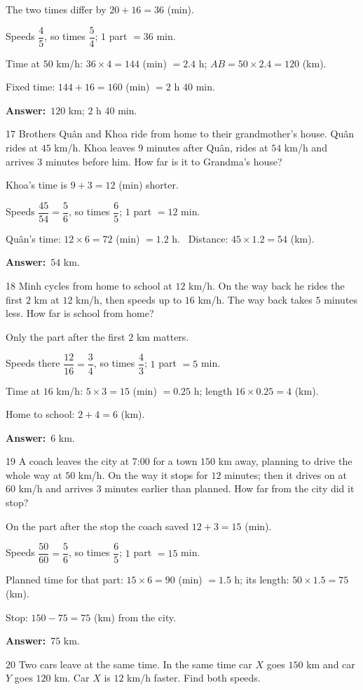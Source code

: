 \documentclass[11pt]{article}
\newif\ifsol \solfalse
\providecommand{\AnsWord}{Đáp số}
\newcommand{\dapso}[1]{\par\textbf{\AnsWord:}\ #1}
\newcommand{\probsol}[1]{%
  \begin{lrbox}{\solmeasure}\begin{minipage}{\dimexpr\linewidth-24pt\relax}#1\end{minipage}\end{lrbox}%
  \ifsol
    \begin{solbox}#1\end{solbox}%
  \else
    \setlength{\solht}{\dimexpr\ht\solmeasure+\dp\solmeasure+0.85cm\relax}%
    \ifdim\solht<1.35cm\setlength{\solht}{1.35cm}\fi
    \begin{tcolorbox}[colback=white,colframe=Line,boxrule=0.8pt,arc=5pt,
      left=8pt,right=8pt,top=4pt,bottom=4pt,height=\solht]{\footnotesize\color{Slate}\itshape\WorkWord}\end{tcolorbox}%
  \fi}
\newcommand{\gap}{\vspace{0.3cm}}
\def\WorkWord{Your work:}
\def\AnsWord{Answer}
\begin{document}
\probsol{
The two times differ by $20+16=36$ (min).\par Speeds $\dfrac45$, so times $\dfrac54$; $1$ part $=36$ min.\par
Time at $50$ km/h: $36\times4=144$ (min) $=2.4$ h; $AB=50\times2.4=120$ (km).\par
Fixed time: $144+16=160$ (min) $=2$ h $40$ min.
\dapso{$120$ km; $2$ h $40$ min.}}
\gap
\begin{probbox}{17}{\relax}
Brothers Quân and Khoa ride from home to their grandmother's house. Quân rides at $45$ km/h. Khoa leaves $9$ minutes after Quân, rides at $54$ km/h and arrives $3$ minutes before him. How far is it to Grandma's house?
\end{probbox}
\probsol{
Khoa's time is $9+3=12$ (min) shorter.\par Speeds $\dfrac{45}{54}=\dfrac56$, so times $\dfrac65$; $1$ part $=12$ min.\par
Quân's time: $12\times6=72$ (min) $=1.2$ h. \ Distance: $45\times1.2=54$ (km).
\dapso{$54$ km.}}
\gap
\begin{probbox}{18}{\relax}
Minh cycles from home to school at $12$ km/h. On the way back he rides the first $2$ km at $12$ km/h, then speeds up to $16$ km/h. The way back takes $5$ minutes less. How far is school from home?
\end{probbox}
\probsol{
Only the part after the first $2$ km matters.\par Speeds there $\dfrac{12}{16}=\dfrac34$, so times $\dfrac43$; $1$ part $=5$ min.\par
Time at $16$ km/h: $5\times3=15$ (min) $=0.25$ h; length $16\times0.25=4$ (km).\par Home to school: $2+4=6$ (km).
\dapso{$6$ km.}}
\gap
\begin{probbox}{19}{\relax}
A coach leaves the city at 7:00 for a town $150$ km away, planning to drive the whole way at $50$ km/h. On the way it stops for $12$ minutes; then it drives on at $60$ km/h and arrives $3$ minutes earlier than planned. How far from the city did it stop?
\end{probbox}
\probsol{
On the part after the stop the coach saved $12+3=15$ (min).\par Speeds $\dfrac{50}{60}=\dfrac56$, so times $\dfrac65$; $1$ part $=15$ min.\par
Planned time for that part: $15\times6=90$ (min) $=1.5$ h; its length: $50\times1.5=75$ (km).\par
Stop: $150-75=75$ (km) from the city.
\dapso{$75$ km.}}
\gap
\begin{probbox}{20}{\relax}
Two cars leave at the same time. In the same time car $X$ goes $150$ km and car $Y$ goes $120$ km. Car $X$ is $12$ km/h faster. Find both speeds.
\end{probbox}
\end{document}
